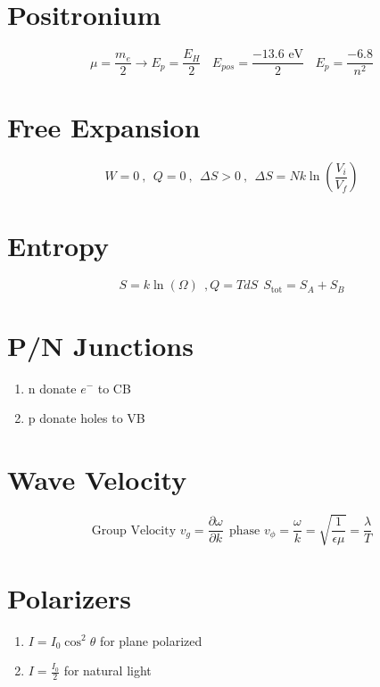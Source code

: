 \documentclass[10pt,a4paper]{article}
\begin{document}
\section{Positronium} %
\label{sec:positronium_}
\begin{equation}
    \mu = \frac{m_e}{2} \rightarrow E_p = \frac{E_H}{2} ~~~~ E_{pos} = \frac{-13.6 \textrm{ eV}}{2} ~~~~ E_p = \frac{-6.8}{n^2}
\end{equation}

\section{Free Expansion} %
\label{sec:free_expansion}
\begin{equation}
    W = 0~,~~ Q = 0~,~~ \Delta S > 0~,~~ \Delta S = Nk \ln \left( \frac{V_i}{V_f} \right) 
\end{equation}

\section{Entropy} %
\label{sec:entropy}
\begin{equation}
    S = k\ln (\Omega)~~, Q = TdS~~ S_{\textrm{tot}}= S_A + S_B
\end{equation}

\section{P/N Junctions} %
\label{sec:p_n_junctions}
\begin{enumerate}
    \item n donate $e^-$ to CB 
    \item p donate holes to VB
\end{enumerate}

\section{Wave Velocity} %
\label{sec:wave_velocity}
\begin{equation}
    \textrm{Group Velocity } v_g = \frac{\partial \omega }{\partial k}~~ \textrm{phase }v_\phi = \frac{\omega}{k} = \sqrt{\frac{1}{\epsilon \mu}} = \frac{\lambda}{T}
\end{equation}

\section{Polarizers} %
\label{sec:polarizers}
\begin{enumerate}
    \item $I=I_0 \cos^2 \theta$ for plane polarized 
    \item $I = \frac{I_0}{2}$ for natural light
\end{enumerate}
\end{document}
